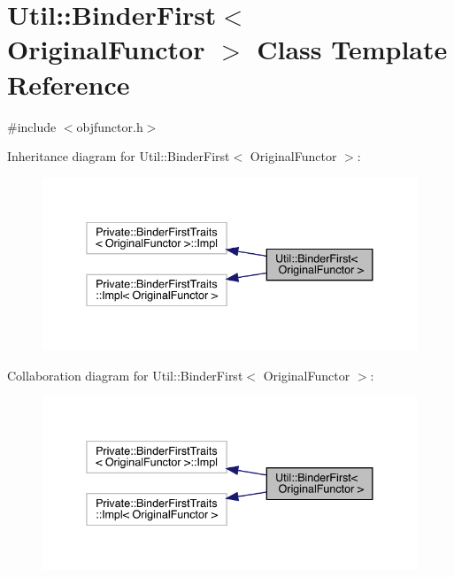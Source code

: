\hypertarget{classUtil_1_1BinderFirst}{}\section{Util\+:\+:Binder\+First$<$ Original\+Functor $>$ Class Template Reference}
\label{classUtil_1_1BinderFirst}


{\ttfamily \#include $<$objfunctor.\+h$>$}



Inheritance diagram for Util\+:\+:Binder\+First$<$ Original\+Functor $>$\+:\nopagebreak
\begin{figure}[H]
\begin{center}
\leavevmode
\includegraphics[width=338pt]{d0/d64/classUtil_1_1BinderFirst__inherit__graph}
\end{center}
\end{figure}


Collaboration diagram for Util\+:\+:Binder\+First$<$ Original\+Functor $>$\+:\nopagebreak
\begin{figure}[H]
\begin{center}
\leavevmode
\includegraphics[width=338pt]{dc/d5d/classUtil_1_1BinderFirst__coll__graph}
\end{center}
\end{figure}
